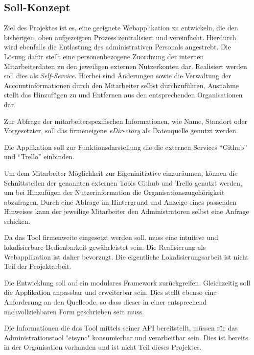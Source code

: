 \subsection{Soll-Konzept}
\label{sec:Soll-Konzept}
Ziel des Projektes ist es, eine geeignete Webapplikation zu entwickeln, die den bisherigen, oben aufgezeigten Prozess zentralisiert und vereinfacht. Hierdurch wird ebenfalls die Entlastung des administrativen Personals angestrebt.
Die Lösung dafür stellt eine personenbezogene Zuordnung der internen Mitarbeiterdaten zu den jeweiligen externen Nutzerkonten dar.
Realisiert werden soll dies als \textit{Self-Service}. Hierbei sind Änderungen sowie die Verwaltung der Accountinformationen durch den Mitarbeiter selbst durchzuführen. Ausnahme stellt das Hinzufügen zu und Entfernen aus den entsprechenden Organisationen dar.

Zur Abfrage der mitarbeiterspezifischen Informationen, wie Name, Standort oder Vorgesetzter, soll
das firmeneigene \textit{eDirectory} als Datenquelle genutzt werden.

Die Applikation soll zur Funktionsdarstellung die die externen Services “Github” und “Trello” einbinden.

Um dem Mitarbeiter Möglichkeit zur Eigeninitiative einzuräumen, können die Schnittstellen der
genannten externen Tools Github und Trello genutzt werden, um bei Hinzufügen der Nutzerinformation
die Organisationszugehörigkeit abzufragen. Durch eine Abfrage im Hintergrund und Anzeige eines
passenden Hinweises kann der jeweilige Mitarbeiter den Administratoren selbst eine Anfrage schicken.

Da das Tool firmenweite eingesetzt werden soll, muss eine intuitive und lokalisierbare
Bedienbarkeit gewährleistet sein. Die Realisierung als Webapplikation ist daher bevorzugt.
Die eigentliche Lokalisierungsarbeit ist nicht Teil der Projektarbeit.

Die Entwicklung soll auf ein modulares Framework zurückgreifen. Gleichzeitig soll die Applikation anpassbar und erweiterbar sein. Dies stellt ebenso eine Anforderung an den Quellcode, so dass dieser in einer entsprechend nachvollziehbaren Form geschrieben sein muss.

Die Informationen die das Tool mittels seiner API bereitstellt, müssen für das Administrationstool "etsync" konsumierbar und verarbeitbar sein. Dies ist bereits in der Organisation vorhanden und ist nicht Teil dieses Projektes.

